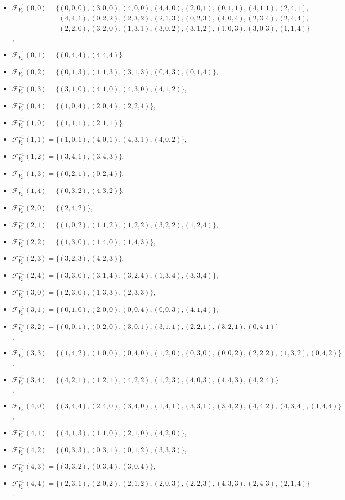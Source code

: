 \documentclass[11pt,a4paper]{article}
\theoremstyle{definition}
\newcommand{\mF}{\mathcal{F}}
\begin{document}
\begin{itemize}
    \item $\mF_{V_2}^{-1}(0,0) = \{(0,0,0), (3,0,0), (4,0,0), (4,4,0), (2,0,1), (0,1,1), (4,1,1), (2,4,1),$\\
    $\phantom{\mF_{V_2}^{-1}(0,0) = \{}(4,4,1),(0,2,2),(2,3,2),(2,1,3),(0,2,3),(4,0,4),(2,3,4),(2,4,4),$\\
    $\phantom{\mF_{V_2}^{-1}(0,0) = \{}(2,2,0),(3,2,0),(1,3,1),(3,0,2),(3,1,2),(1,0,3),(3,0,3),(1,1,4)\}$,
    \item $\mF_{V_2}^{-1}(0,1) = \{(0,4,4),(4,4,4)\}$,
    \item $\mF_{V_2}^{-1}(0,2) = \{(0,1,3),(1,1,3),(3,1,3),(0,4,3),(0,1,4)\}$,
    \item $\mF_{V_2}^{-1}(0,3) = \{(3,1,0),(4,1,0),(4,3,0),(4,1,2)\}$,
    \item $\mF_{V_2}^{-1}(0,4) = \{(1,0,4),(2,0,4),(2,2,4)\}$,
    \item $\mF_{V_2}^{-1}(1,0) = \{(1,1,1),(2,1,1)\}$,
    \item $\mF_{V_2}^{-1}(1,1) = \{(1,0,1),(4,0,1),(4,3,1),(4,0,2)\}$,
    \item $\mF_{V_2}^{-1}(1,2) = \{(3,4,1),(3,4,3)\}$,
    \item $\mF_{V_2}^{-1}(1,3) = \{(0,2,1),(0,2,4)\}$,
    \item $\mF_{V_2}^{-1}(1,4) = \{(0,3,2),(4,3,2)\}$,
    \item $\mF_{V_2}^{-1}(2,0) = \{(2,4,2)\}$,
    \item $\mF_{V_2}^{-1}(2,1) = \{(1,0,2),(1,1,2),(1,2,2),(3,2,2),(1,2,4)\}$,
    \item $\mF_{V_2}^{-1}(2,2) = \{(1,3,0),(1,4,0),(1,4,3)\}$,
    \item $\mF_{V_2}^{-1}(2,3) = \{(3,2,3),(4,2,3)\}$,
    \item $\mF_{V_2}^{-1}(2,4) = \{(3,3,0),(3,1,4),(3,2,4),(1,3,4),(3,3,4)\}$,
    \item $\mF_{V_2}^{-1}(3,0) = \{(2,3,0),(1,3,3),(2,3,3)\}$,
    \item $\mF_{V_2}^{-1}(3,1) = \{(0,1,0),(2,0,0),(0,0,4),(0,0,3),(4,1,4)\}$,
    \item $\mF_{V_2}^{-1}(3,2) = \{(0,0,1),(0,2,0),(3,0,1),(3,1,1),(2,2,1),(3,2,1),(0,4,1)\}$,
    \item $\mF_{V_2}^{-1}(3,3) = \{(1,4,2),(1,0,0),(0,4,0),(1,2,0),(0,3,0),(0,0,2),(2,2,2),(1,3,2),(0,4,2)\}$,
    \item $\mF_{V_2}^{-1}(3,4) = \{(4,2,1),(1,2,1),(4,2,2),(1,2,3),(4,0,3),(4,4,3),(4,2,4)\}$,
    \item $\mF_{V_2}^{-1}(4,0) = \{(3,4,4),(2,4,0),(3,4,0),(1,4,1),(3,3,1),(3,4,2),(4,4,2),(4,3,4),(1,4,4)\}$,
    \item $\mF_{V_2}^{-1}(4,1) = \{(4,1,3),(1,1,0),(2,1,0),(4,2,0)\}$,
    \item $\mF_{V_2}^{-1}(4,2) = \{(0,3,3),(0,3,1),(0,1,2),(3,3,3)\}$,
    \item $\mF_{V_2}^{-1}(4,3) = \{(3,3,2),(0,3,4),(3,0,4)\}$,
    \item $\mF_{V_2}^{-1}(4,4) = \{(2,3,1),(2,0,2),(2,1,2),(2,0,3),(2,2,3),(4,3,3),(2,4,3),(2,1,4)\}$.
\end{itemize}
\end{document}
